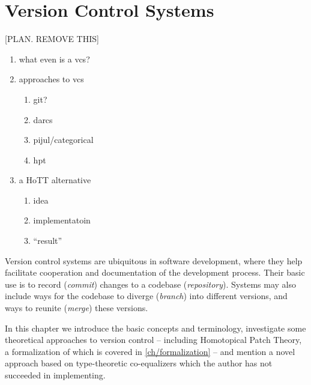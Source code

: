 \chapter{Version Control Systems}

[PLAN. REMOVE THIS]
\begin{enumerate}
\item what even is a vcs?
\item approaches to vcs
  \begin{enumerate}
  \item git?
  \item darcs
  \item pijul/categorical
  \item hpt
  \end{enumerate}
\item a HoTT alternative
  \begin{enumerate}
  \item idea
  \item implementatoin
  \item ``result''
  \end{enumerate}
\end{enumerate}

Version control systems are ubiquitous in software development, where they
help facilitate cooperation and documentation of
the development process. Their basic use is to record (\emph{commit}) changes
to a codebase (\emph{repository}). Systems may also include ways for the
codebase to diverge (\emph{branch}) into different versions, and ways to
reunite (\emph{merge}) these versions.

In this chapter we introduce the basic concepts and terminology, investigate some
theoretical approaches to version control -- including Homotopical Patch Theory,
a formalization of which is covered in \autoref{ch/formalization} -- and mention
a novel approach based on type-theoretic co-equalizers which the author has not
succeeded in implementing.
